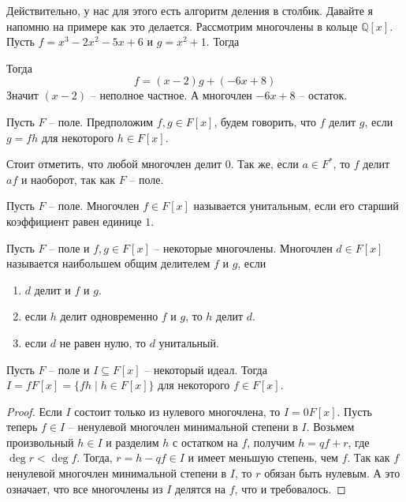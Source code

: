 Действительно, у нас для этого есть алгоритм деления в столбик.
Давайте я напомню на примере как это делается.
Рассмотрим многочлены в кольце $\mathbb Q[x]$.
Пусть $f = x^3 - 2x^2 - 5x + 6$ и $g = x^2 + 1$.
Тогда
\begin{center}
\end{center}
Тогда
\[
f = (x-2) g+ (-6 x + 8)
\]
Значит $(x - 2)$ -- неполное частное.
А многочлен $-6x + 8$ -- остаток.

\begin{definition}
\label{def::PolyDivision}
Пусть $F$ -- поле.
Предположим $f, g\in F[x]$, будем говорить, что $f$ делит $g$, если $g = fh$ для некоторого $h\in F[x]$.
\end{definition}

Стоит отметить, что любой многочлен делит $0$.
Так же, если $a\in F^*$, то $f$ делит $af$ и наоборот, так как $F$ -- поле.

\begin{definition}
\label{def::PolyUni}
Пусть $F$ -- поле.
Многочлен $f\in F[x]$ называется унитальным, если его старший коэффициент равен единице $1$.
\end{definition}

\begin{definition}
\label{def::PolyGcd}
Пусть $F$ -- поле и $f, g\in F[x]$ -- некоторые многочлены.
Многочлен $d\in F[x]$ называется наибольшем общим делителем $f$ и $g$, если
\begin{enumerate}
\item $d$ делит и $f$ и $g$.

\item если $h$ делит одновременно $f$ и $g$, то $h$ делит $d$.

\item если $d$ не равен нулю, то $d$ унитальный.
\end{enumerate}
\end{definition}


\begin{claim}
\label{claim::PolyIdeals}
Пусть $F$ -- поле и $I\subseteq F[x]$ -- некоторый идеал.
Тогда $I = f F[x] = \{fh\mid h\in F[x]\}$ для некоторого $f\in F[x]$.
\end{claim}
\begin{proof}
Если $I$ состоит только из нулевого многочлена, то $I = 0 F[x]$.
Пусть теперь $f\in I$ -- ненулевой многочлен минимальной степени в $I$.
Возьмем произвольный $h\in I$ и разделим $h$ с остатком на $f$, получим $h = qf + r$, где $\deg r < \deg f$.
Тогда, $r = h - qf \in I$ и имеет меньшую степень, чем $f$.
Так как $f$ ненулевой многочлен минимальной степени в $I$, то $r$ обязан быть нулевым.
А это означает, что все многочлены из $I$ делятся на $f$, что и требовалось.
\end{proof}

